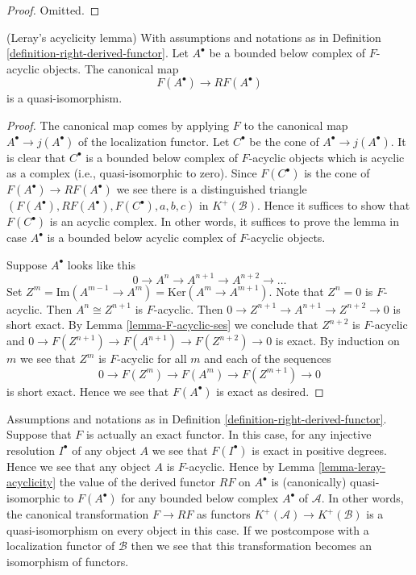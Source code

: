 \begin{proof}
Omitted.
\end{proof}

\begin{lemma}
\label{lemma-leray-acyclicity}
(Leray's acyclicity lemma)
With assumptions and notations as in
Definition \ref{definition-right-derived-functor}.
Let $A^\bullet$ be a bounded below complex of
$F$-acyclic objects. The canonical map
$$
F(A^\bullet) \longrightarrow RF(A^\bullet)
$$
is a quasi-isomorphism.
\end{lemma}

\begin{proof}
The canonical map comes by applying $F$ to the canonical map
$A^\bullet \to j(A^\bullet)$ of the localization functor.
Let $C^\bullet$ be the cone of $A^\bullet \to j(A^\bullet)$.
It is clear that $C^\bullet$ is a bounded below complex of
$F$-acyclic objects which is acyclic as a complex (i.e., quasi-isomorphic
to zero). Since $F(C^\bullet)$ is the cone of
$F(A^\bullet) \to RF(A^\bullet)$ we see there is a distinguished
triangle $(F(A^\bullet), RF(A^\bullet), F(C^\bullet), a, b, c)$
in $K^{+}(\mathcal{B})$. Hence it suffices to show that $F(C^\bullet)$
is an acyclic complex. In other words, it suffices to prove the lemma
in case $A^\bullet$ is a bounded below acyclic complex of $F$-acyclic objects.

\medskip\noindent
Suppose $A^\bullet$ looks like this
$$
0 \to A^n \to A^{n + 1} \to A^{n + 2} \to \ldots
$$
Set
$Z^m = \text{Im}(A^{m - 1} \to A^m) = \text{Ker}(A^m \to A^{m + 1})$.
Note that $Z^n = 0$ is $F$-acyclic. Then $A^n \cong Z^{n + 1}$
is $F$-acyclic. Then $0 \to Z^{n + 1} \to A^{n + 1} \to Z^{n + 2} \to 0$
is short exact. By Lemma \ref{lemma-F-acyclic-ses} we conclude that
$Z^{n + 2}$ is $F$-acyclic and 
$0 \to F(Z^{n + 1}) \to F(A^{n + 1}) \to F(Z^{n + 2}) \to 0$ is exact.
By induction on $m$ we see that $Z^m$ is $F$-acyclic for
all $m$ and each of the sequences
$$
0 \to F(Z^m) \to F(A^m) \to F(Z^{m + 1}) \to 0
$$
is short exact. Hence we see that $F(A^\bullet)$ is exact as desired.
\end{proof}

\begin{remark}
\label{remark-right-derived-exact-functor}
Assumptions and notations as in
Definition \ref{definition-right-derived-functor}.
Suppose that $F$ is actually an exact functor.
In this case, for any injective resolution $I^\bullet$ of any object $A$
we see that $F(I^\bullet)$ is exact in positive degrees.
Hence we see that any object $A$ is $F$-acyclic.
Hence by Lemma \ref{lemma-leray-acyclicity} the
value of the derived functor $RF$ on $A^\bullet$ is
(canonically) quasi-isomorphic to $F(A^\bullet)$
for any bounded below complex $A^\bullet$ of $\mathcal{A}$.
In other words, the canonical transformation
$F \to RF$ as functors $K^{+}(\mathcal{A}) \to K^{+}(\mathcal{B})$
is a quasi-isomorphism on every object in this case.
If we postcompose with a localization functor of $\mathcal{B}$
then we see that this transformation becomes an isomorphism of functors.
\end{remark}





